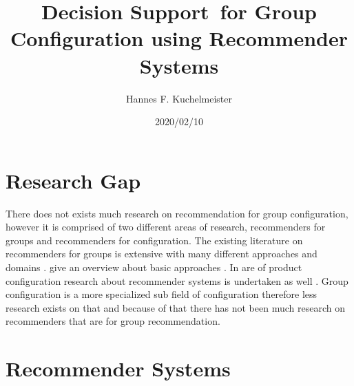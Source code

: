 \documentclass{article}
\begin{document}
\title{Decision Support for Group Configuration using Recommender Systems}
\author{Hannes F. Kuchelmeister}
\date{2020/02/10}

\maketitle

\tableofcontents

\newpage

\section{Research Gap}

There does not exists much research on recommendation for group configuration, however it is comprised of two different areas of research, recommenders for groups and recommenders for configuration.
The existing literature on recommenders for groups is extensive with many different approaches and domains \cite{delicResearchMethodsGroup2016, chenInterfaceInteractionDesign2011, atasItemRecommendationUsing2017, jamesonRecommendationGroups2007, chenEmpatheticonsDesigningEmotion2014, liuCGSPAComprehensiveGroup2019}. \citeauthor{felfernigGroupRecommenderSystems2018} give an overview about basic approaches \cite{felfernigGroupRecommenderSystems2018}.
In are of product configuration research about recommender systems is undertaken as well \cite{pereiraFeaturebasedPersonalizedRecommender2016, scholzConfigurationbasedRecommenderSystem2017, scholzEffectsDecisionSpace2017}.
Group configuration is a more specialized sub field of configuration therefore less research exists on that and because of that there has not been much research on recommenders that are for group recommendation. 


\section{Recommender Systems}
\end{document}
